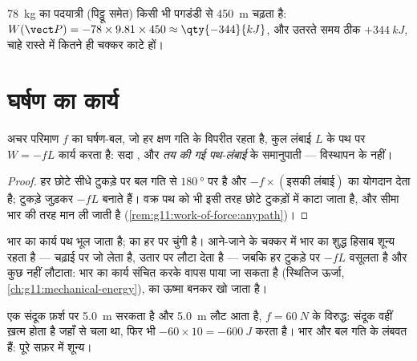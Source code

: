 \begin{example}[पदयात्री]\label{ex:g11:work-of-force:hiker}
\qty{78}{kg} का पदयात्री (पिट्ठू समेत) किसी भी पगडंडी से \qty{450}{m} चढ़ता है:
$W(\vect P) = -78 \times 9.81 \times 450 \approx \qty{-344}{kJ}$, और उतरते समय ठीक $+\qty{344}{kJ}$, चाहे रास्ते में कितने ही चक्कर काटे हों।
\end{example}

\section{घर्षण का कार्य}

\begin{proposition}[सरकन-घर्षण का कार्य]\label{prop:g11:work-of-force:friction}
अचर परिमाण $f$ का घर्षण-बल, जो हर क्षण गति के विपरीत
रहता है, कुल लंबाई $L$ के पथ पर $W = -fL$ कार्य करता है: सदा
, और \emph{तय की गई पथ-लंबाई} के समानुपाती --- विस्थापन के
नहीं।
\end{proposition}

\begin{proof}
हर छोटे सीधे टुकड़े पर बल गति से $\qty{180}{\degree}$ पर है और $-f \times (\text{इसकी लंबाई})$ का योगदान
देता है; टुकड़े जुड़कर $-fL$ बनाते हैं। वक्र पथ को भी इसी तरह छोटे टुकड़ों
में काटा जाता है, और सीमा भार की तरह मान ली जाती है (\cref{rem:g11:work-of-force:anypath})।
\end{proof}

\begin{remark}[घर्षण बनाम भार: बड़ी दरार]\label{rem:g11:work-of-force:divide}
भार का कार्य पथ भूल जाता है;  का हर
 पर चुंगी है। आने-जाने के चक्कर में भार का शुद्ध हिसाब
शून्य रहता है --- चढ़ाई पर जो लेता है, उतार पर लौटा देता है --- जबकि
 हर टुकड़े पर $-fL$ वसूलता है और कुछ नहीं लौटाता:
भार का कार्य संचित करके वापस पाया जा सकता है (स्थितिज
ऊर्जा, \cref{ch:g11:mechanical-energy}),  का ऊष्मा बनकर खो जाता है।
\end{remark}

\begin{example}[जाना और लौटना]\label{ex:g11:work-of-force:roundtrip}
एक संदूक फ़र्श पर \qty{5.0}{m} सरकता है और \qty{5.0}{m} लौट आता है, $f = \qty{60}{N}$ के
विरुद्ध: संदूक वहीं ख़त्म होता है जहाँ से चला था, फिर भी 
$-60 \times 10 =
\qty{-600}{J}$ करता है। भार और  बल गति के लंबवत हैं: पूरे
सफ़र में शून्य।
\end{example}

